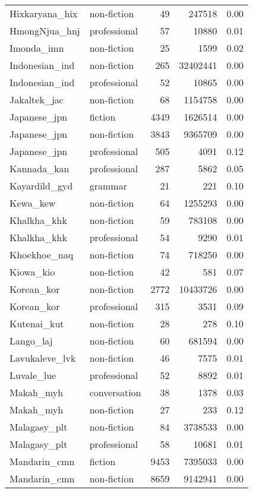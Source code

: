 \begin{longtable}{llrrr}
  Hixkaryana\_hix & non-fiction & 49 & 247518 & 0.00 \\ 
  HmongNjua\_hnj & professional & 57 & 10880 & 0.01 \\ 
  Imonda\_imn & non-fiction & 25 & 1599 & 0.02 \\ 
  Indonesian\_ind & non-fiction & 265 & 32402441 & 0.00 \\ 
  Indonesian\_ind & professional & 52 & 10865 & 0.00 \\ 
  Jakaltek\_jac & non-fiction & 68 & 1154758 & 0.00 \\ 
  Japanese\_jpn & fiction & 4349 & 1626514 & 0.00 \\ 
  Japanese\_jpn & non-fiction & 3843 & 9365709 & 0.00 \\ 
  Japanese\_jpn & professional & 505 & 4091 & 0.12 \\ 
  Kannada\_kan & professional & 287 & 5862 & 0.05 \\ 
  Kayardild\_gyd & grammar & 21 & 221 & 0.10 \\ 
  Kewa\_kew & non-fiction & 64 & 1255293 & 0.00 \\ 
  Khalkha\_khk & non-fiction & 59 & 783108 & 0.00 \\ 
  Khalkha\_khk & professional & 54 & 9290 & 0.01 \\ 
  Khoekhoe\_naq & non-fiction & 74 & 718250 & 0.00 \\ 
  Kiowa\_kio & non-fiction & 42 & 581 & 0.07 \\ 
  Korean\_kor & non-fiction & 2772 & 10433726 & 0.00 \\ 
  Korean\_kor & professional & 315 & 3531 & 0.09 \\ 
  Kutenai\_kut & non-fiction & 28 & 278 & 0.10 \\ 
  Lango\_laj & non-fiction & 60 & 681594 & 0.00 \\ 
  Lavukaleve\_lvk & non-fiction & 46 & 7575 & 0.01 \\ 
  Luvale\_lue & professional & 52 & 8892 & 0.01 \\ 
  Makah\_myh & conversation & 38 & 1378 & 0.03 \\ 
  Makah\_myh & non-fiction & 27 & 233 & 0.12 \\ 
  Malagasy\_plt & non-fiction & 84 & 3738533 & 0.00 \\ 
  Malagasy\_plt & professional & 58 & 10681 & 0.01 \\ 
  Mandarin\_cmn & fiction & 9453 & 7395033 & 0.00 \\ 
  Mandarin\_cmn & non-fiction & 8659 & 9142941 & 0.00 \\ 

\end{longtable}
